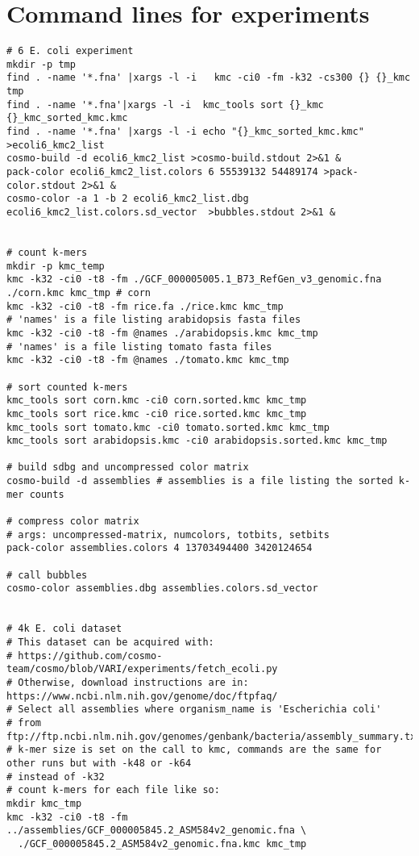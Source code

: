 \documentclass{article}
\begin{document}
\section{Command lines for experiments}
\begin{verbatim}
# 6 E. coli experiment
mkdir -p tmp
find . -name '*.fna' |xargs -l -i   kmc -ci0 -fm -k32 -cs300 {} {}_kmc tmp
find . -name '*.fna'|xargs -l -i  kmc_tools sort {}_kmc {}_kmc_sorted_kmc.kmc
find . -name '*.fna' |xargs -l -i echo "{}_kmc_sorted_kmc.kmc" >ecoli6_kmc2_list
cosmo-build -d ecoli6_kmc2_list >cosmo-build.stdout 2>&1 &
pack-color ecoli6_kmc2_list.colors 6 55539132 54489174 >pack-color.stdout 2>&1 &
cosmo-color -a 1 -b 2 ecoli6_kmc2_list.dbg ecoli6_kmc2_list.colors.sd_vector  >bubbles.stdout 2>&1 &


# count k-mers
mkdir -p kmc_temp
kmc -k32 -ci0 -t8 -fm ./GCF_000005005.1_B73_RefGen_v3_genomic.fna ./corn.kmc kmc_tmp # corn
kmc -k32 -ci0 -t8 -fm rice.fa ./rice.kmc kmc_tmp
# 'names' is a file listing arabidopsis fasta files
kmc -k32 -ci0 -t8 -fm @names ./arabidopsis.kmc kmc_tmp 
# 'names' is a file listing tomato fasta files
kmc -k32 -ci0 -t8 -fm @names ./tomato.kmc kmc_tmp 

# sort counted k-mers
kmc_tools sort corn.kmc -ci0 corn.sorted.kmc kmc_tmp
kmc_tools sort rice.kmc -ci0 rice.sorted.kmc kmc_tmp
kmc_tools sort tomato.kmc -ci0 tomato.sorted.kmc kmc_tmp
kmc_tools sort arabidopsis.kmc -ci0 arabidopsis.sorted.kmc kmc_tmp

# build sdbg and uncompressed color matrix
cosmo-build -d assemblies # assemblies is a file listing the sorted k-mer counts

# compress color matrix
# args: uncompressed-matrix, numcolors, totbits, setbits
pack-color assemblies.colors 4 13703494400 3420124654 

# call bubbles
cosmo-color assemblies.dbg assemblies.colors.sd_vector


# 4k E. coli dataset
# This dataset can be acquired with:
# https://github.com/cosmo-team/cosmo/blob/VARI/experiments/fetch_ecoli.py
# Otherwise, download instructions are in: https://www.ncbi.nlm.nih.gov/genome/doc/ftpfaq/
# Select all assemblies where organism_name is 'Escherichia coli' 
# from ftp://ftp.ncbi.nlm.nih.gov/genomes/genbank/bacteria/assembly_summary.txt
# k-mer size is set on the call to kmc, commands are the same for other runs but with -k48 or -k64 
# instead of -k32
# count k-mers for each file like so:
mkdir kmc_tmp
kmc -k32 -ci0 -t8 -fm ../assemblies/GCF_000005845.2_ASM584v2_genomic.fna \
  ./GCF_000005845.2_ASM584v2_genomic.fna.kmc kmc_tmp


\end{verbatim}
\end{document}
